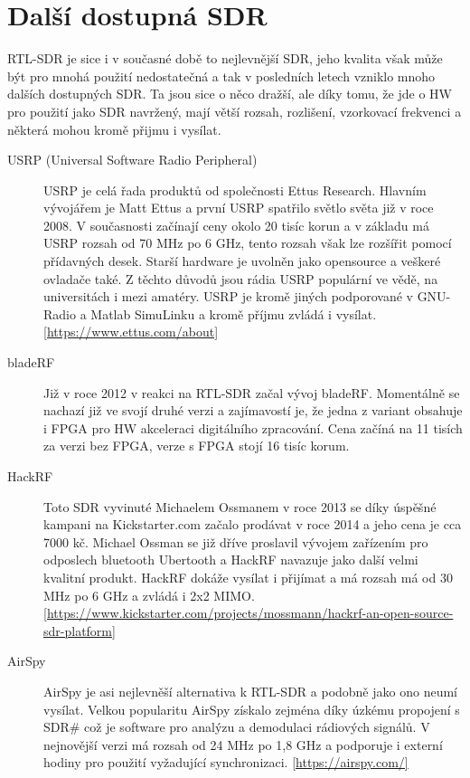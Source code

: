 \documentclass{ctuthesis}
\begin{document}
\section{Další dostupná SDR}
RTL-SDR je sice i v současné době to nejlevnější SDR, jeho kvalita však může být pro mnohá použití nedostatečná a tak v posledních letech vzniklo mnoho dalších dostupných SDR. Ta jsou sice o něco dražší, ale díky tomu, že jde o HW pro použití jako SDR navržený, mají větší rozsah, rozlišení, vzorkovací frekvenci a některá mohou kromě přijmu i vysílat.
\begin{description}
\item[USRP (Universal Software Radio Peripheral)]
USRP je celá řada produktů od společnosti Ettus Research. Hlavním vývojářem je Matt Ettus a první USRP spatřilo světlo světa již v roce 2008. V současnosti začínají ceny okolo 20 tisíc korun a v základu má USRP rozsah od 70 MHz po 6 GHz, tento rozsah však lze rozšířit pomocí přídavných desek. Starší hardware je uvolněn jako opensource a veškeré ovladače také. Z těchto důvodů jsou rádia USRP populární ve vědě, na universitách i mezi amatéry. USRP je kromě jiných podporované v GNU-Radio a Matlab SimuLinku a kromě příjmu zvládá i vysílat. \ref{https://www.ettus.com/about}
\item[bladeRF]
Již v roce 2012 v reakci na RTL-SDR začal vývoj bladeRF. Momentálně se nachazí již ve svojí druhé verzi a zajímavostí je, že jedna z variant obsahuje i FPGA pro HW akceleraci digitálního zpracování. Cena začíná na 11 tisích za verzi bez FPGA, verze s FPGA stojí 16 tisíc korum. 
\item[HackRF]
Toto SDR vyvinuté Michaelem Ossmanem v roce 2013 se díky úspěšné kampani na Kickstarter.com  začalo prodávat v roce 2014 a jeho cena je cca 7000 kč. Michael Ossman se již dříve proslavil vývojem zařízením pro odposlech bluetooth Ubertooth a HackRF navazuje jako další velmi kvalitní produkt. HackRF dokáže vysílat i přijímat a má rozsah má od 30 MHz po 6 GHz a zvládá i 2x2 MIMO. \ref{https://www.kickstarter.com/projects/mossmann/hackrf-an-open-source-sdr-platform}
\item[AirSpy]
AirSpy je asi nejlevněší alternativa k RTL-SDR a podobně jako ono neumí vysílat. Velkou popularitu AirSpy získalo zejména díky úzkému propojení s SDR\#  což je software pro analýzu a demodulaci rádiových signálů. V nejnovější verzi má rozsah od 24 MHz po 1,8 GHz a podporuje i externí hodiny pro použití vyžadující synchronizaci.
\ref{https://airspy.com/}
\end{description}
\end{document}
